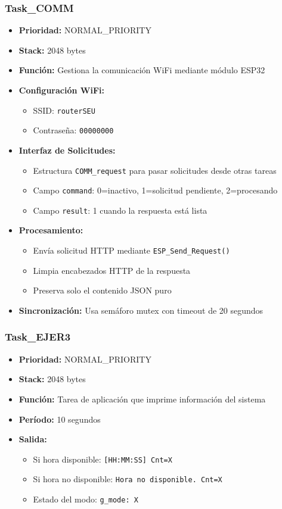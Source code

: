 \documentclass[12pt,a4paper]{article}
\begin{document}
\subsubsection{Task\_COMM}
\begin{itemize}
    \item \textbf{Prioridad:} NORMAL\_PRIORITY
    \item \textbf{Stack:} 2048 bytes
    \item \textbf{Función:} Gestiona la comunicación WiFi mediante módulo ESP32
    \item \textbf{Configuración WiFi:}
    \begin{itemize}
        \item SSID: \texttt{routerSEU}
        \item Contraseña: \texttt{00000000}
    \end{itemize}
    \item \textbf{Interfaz de Solicitudes:}
    \begin{itemize}
        \item Estructura \texttt{COMM\_request} para pasar solicitudes desde otras tareas
        \item Campo \texttt{command}: 0=inactivo, 1=solicitud pendiente, 2=procesando
        \item Campo \texttt{result}: 1 cuando la respuesta está lista
    \end{itemize}
    \item \textbf{Procesamiento:}
    \begin{itemize}
        \item Envía solicitud HTTP mediante \texttt{ESP\_Send\_Request()}
        \item Limpia encabezados HTTP de la respuesta
        \item Preserva solo el contenido JSON puro
    \end{itemize}
    \item \textbf{Sincronización:} Usa semáforo mutex con timeout de 20 segundos
\end{itemize}

\subsubsection{Task\_EJER3}
\begin{itemize}
    \item \textbf{Prioridad:} NORMAL\_PRIORITY
    \item \textbf{Stack:} 2048 bytes
    \item \textbf{Función:} Tarea de aplicación que imprime información del sistema
    \item \textbf{Período:} 10 segundos
    \item \textbf{Salida:}
    \begin{itemize}
        \item Si hora disponible: \texttt{[HH:MM:SS] Cnt=X}
        \item Si hora no disponible: \texttt{Hora no disponible. Cnt=X}
        \item Estado del modo: \texttt{g\_mode: X}
    \end{itemize}
\end{itemize}
\end{document}

